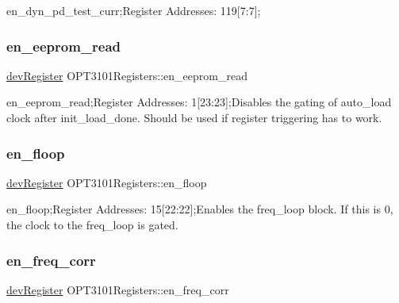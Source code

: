 en\+\_\+dyn\+\_\+pd\+\_\+test\+\_\+curr;Register Addresses\+: 119\mbox{[}7\+:7\mbox{]}; 

\mbox{\label{class_o_p_t3101_registers_a4961f0f3fa6789d072d688591190cd5d}} 
\subsubsection{\texorpdfstring{en\+\_\+eeprom\+\_\+read}{en\_eeprom\_read}}
{\footnotesize\ttfamily \mbox{\hyperlink{classdev_register}{dev\+Register}} O\+P\+T3101\+Registers\+::en\+\_\+eeprom\+\_\+read}



en\+\_\+eeprom\+\_\+read;Register Addresses\+: 1\mbox{[}23\+:23\mbox{]};Disables the gating of auto\+\_\+load clock after init\+\_\+load\+\_\+done. Should be used if register triggering has to work. 

\mbox{\label{class_o_p_t3101_registers_a2bb7d7d4ec062fa328510693777b181e}} 
\subsubsection{\texorpdfstring{en\+\_\+floop}{en\_floop}}
{\footnotesize\ttfamily \mbox{\hyperlink{classdev_register}{dev\+Register}} O\+P\+T3101\+Registers\+::en\+\_\+floop}



en\+\_\+floop;Register Addresses\+: 15\mbox{[}22\+:22\mbox{]};Enables the freq\+\_\+loop block. If this is \textquotesingle{}0\textquotesingle{}, the clock to the freq\+\_\+loop is gated. 

\mbox{\label{class_o_p_t3101_registers_ad4ff884a4bc5553ef01ae669b352edc4}} 
\subsubsection{\texorpdfstring{en\+\_\+freq\+\_\+corr}{en\_freq\_corr}}
{\footnotesize\ttfamily \mbox{\hyperlink{classdev_register}{dev\+Register}} O\+P\+T3101\+Registers\+::en\+\_\+freq\+\_\+corr}



